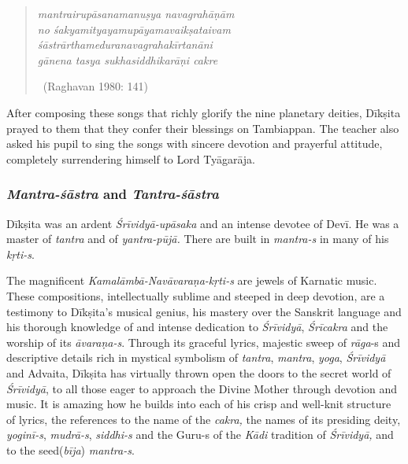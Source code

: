 \begin{verse}
\textit{mantrairupāsanamanuṣya navagrahāṇām}\\ \textit{no śakyamityayamupāyamavaikṣataivam} \\ \textit{śāstrārthameduranavagrahakīrtanāni}\\ \textit{gānena tasya sukhasiddhikarāṇi cakre}  

~\hfill (Raghavan 1980: 141)
\end{verse}

\vspace{-.3cm}

After composing these songs that richly glorify the nine planetary deities, Dīkṣita prayed to them that they confer their blessings on Tambiappan. The teacher also asked his pupil to sing the songs with sincere devotion and prayerful attitude, completely surrendering himself to Lord Tyāgarāja.

\vspace{-.3cm}

\subsubsection*{\textit{Mantra-śāstra} and \textit{Tantra-śāstra}}

\vspace{-.2cm}

Dīkṣita was an ardent \textit{Śrīvidyā-upāsaka} and an intense devotee of Devī. He was a master of \textit{tantra} and of \textit{yantra-pūjā.} There are built in \textit{mantra-s} in many of his \textit{kṛti-s}.

The magnificent \textit{Kamalāmbā-Navāvaraṇa-kṛti-s} are jewels of Karnatic music. These compositions, intellectually sublime and steeped in deep devotion, are a testimony to Dīkṣita’s musical genius, his mastery over the Sanskrit language and his thorough knowledge of and intense dedication to \textit{Śrīvidyā}, \textit{Śrīcakra} and the worship of its \textit{āvaraṇa-s}. Through its graceful lyrics, majestic sweep of \textit{rāga}-s and descriptive details rich in mystical symbolism of \textit{tantra}, \textit{mantra}, \textit{yoga}, \textit{Śrīvidyā} and Advaita, Dīkṣita has virtually thrown open the doors to the secret world of \textit{Śrīvidyā}, to all those eager to approach the Divine Mother through devotion and music. It is amazing how he builds into each of his crisp and well-knit structure of lyrics, the references to the name of the \textit{cakra,} the names of its presiding deity, \textit{yoginī-s}, \textit{mudrā-s}, \textit{siddhi-s} and the Guru-s of the \textit{Kādi} tradition of \textit{Śrīvidyā,} and to the seed(\textit{bīja}) \textit{mantra-s}.

